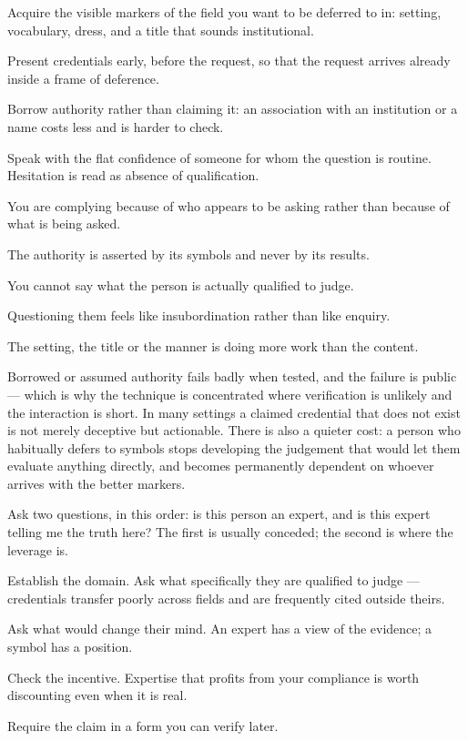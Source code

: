\begin{application}
  \item Acquire the visible markers of the field you want to be deferred to in: setting, vocabulary, dress, and a title that sounds institutional.
  \item Present credentials early, before the request, so that the request arrives already inside a frame of deference.
  \item Borrow authority rather than claiming it: an association with an institution or a name costs less and is harder to check.
  \item Speak with the flat confidence of someone for whom the question is routine. Hesitation is read as absence of qualification.
\end{application}

\begin{feedback}
  \item You are complying because of who appears to be asking rather than because of what is being asked.
  \item The authority is asserted by its symbols and never by its results.
  \item You cannot say what the person is actually qualified to judge.
  \item Questioning them feels like insubordination rather than like enquiry.
  \item The setting, the title or the manner is doing more work than the content.
\end{feedback}

\begin{failure}
Borrowed or assumed authority fails badly when tested, and the failure is public --- which is why the technique is concentrated where verification is unlikely and the interaction is short. In many settings a claimed credential that does not exist is not merely deceptive but actionable. There is also a quieter cost: a person who habitually defers to symbols stops developing the judgement that would let them evaluate anything directly, and becomes permanently dependent on whoever arrives with the better markers.
\end{failure}

\begin{countermeasures}
  \item Ask two questions, in this order: is this person an expert, and is this expert telling me the truth here? The first is usually conceded; the second is where the leverage is.
  \item Establish the domain. Ask what specifically they are qualified to judge --- credentials transfer poorly across fields and are frequently cited outside theirs.
  \item Ask what would change their mind. An expert has a view of the evidence; a symbol has a position.
  \item Check the incentive. Expertise that profits from your compliance is worth discounting even when it is real.
  \item Require the claim in a form you can verify later.
\end{countermeasures}

\seesources
{}
